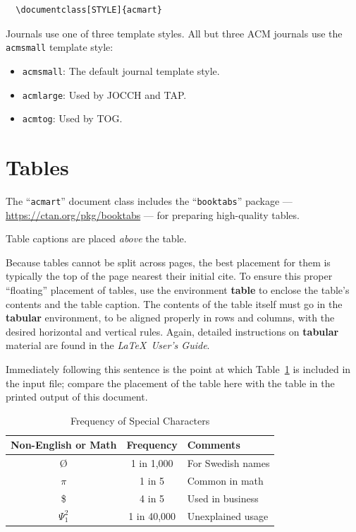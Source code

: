 \documentclass[acmlarge,screen]{acmart}
\begin{document}
\begin{verbatim}
  \documentclass[STYLE]{acmart}
\end{verbatim}

Journals use one of three template styles. All but three ACM journals use the {\verb|acmsmall|} template style:
\begin{itemize}
\item {\verb|acmsmall|}: The default journal template style.
\item {\verb|acmlarge|}: Used by JOCCH and TAP.
\item {\verb|acmtog|}: Used by TOG.
\end{itemize}


\section{Tables}

The ``\verb|acmart|'' document class includes the ``\verb|booktabs|'' package --- \url{https://ctan.org/pkg/booktabs} --- for preparing high-quality tables. 

Table captions are placed {\it above} the table.

Because tables cannot be split across pages, the best placement for them is typically the top of the page nearest their initial cite.  To ensure this proper ``floating'' placement of tables, use the environment \textbf{table} to enclose the table's contents and the table caption.  The contents of the table itself must go in the \textbf{tabular} environment, to be aligned properly in rows and columns, with the desired horizontal and vertical rules.  Again, detailed instructions on \textbf{tabular} material are found in the \textit{\LaTeX\ User's Guide}.

Immediately following this sentence is the point at which Table~\ref{tab:freq} is included in the input file; compare the placement of the table here with the table in the printed output of this document.

\begin{table}
  \caption{Frequency of Special Characters}
  \label{tab:freq}
  \begin{tabular}{ccl}
    \toprule
    Non-English or Math&Frequency&Comments\\
    \midrule
    \O & 1 in 1,000& For Swedish names\\
    $\pi$ & 1 in 5& Common in math\\
    \$ & 4 in 5 & Used in business\\
    $\Psi^2_1$ & 1 in 40,000& Unexplained usage\\
  \bottomrule
\end{tabular}
\end{table}
\end{document}
